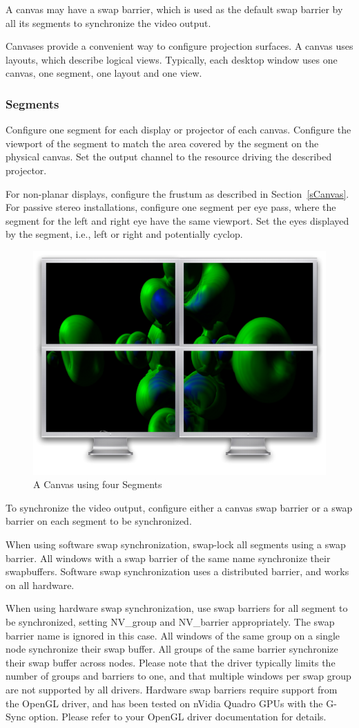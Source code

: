 \documentclass[10pt,a4]{scrartcl}
\newcommand{\sref}[1]{Section~\ref{#1}}
\begin{document}
A canvas may have a swap barrier, which is used as the default swap barrier by
all its segments to synchronize the video output.

Canvases provide a convenient way to configure projection surfaces. A canvas
uses layouts, which describe logical views. Typically, each desktop window uses
one canvas, one segment, one layout and one view.

\subsubsection{Segments}

Configure one \textsf{segment} for each display or projector of each
canvas. Configure the \textsf{viewport} of the segment to match the area
covered by the segment on the physical canvas. Set the output
\textsf{channel} to the resource driving the described projector.

For non-planar displays, configure the frustum as described in
\sref{sCanvas}. For passive stereo installations, configure one segment per eye
pass, where the segment for the left and right eye have the same viewport. Set
the eyes displayed by the segment, i.e., left or right and potentially cyclop.

\begin{figure}
  \includegraphics[width=.382\textwidth]{images/canvas.pdf}
  {\caption{\label{fCanvas}A Canvas using four Segments}}
\end{figure}
To synchronize the video output, configure either a canvas swap barrier or a
swap barrier on each segment to be synchronized.

When using software swap synchronization, swap-lock all segments using a swap
barrier. All windows with a swap barrier of the same name synchronize their
swapbuffers. Software swap synchronization uses a distributed barrier, and works
on all hardware.

When using hardware swap synchronization, use swap barriers for all segment to
be synchronized, setting \textsf{NV\_group} and \textsf{NV\_barrier}
appropriately. The swap barrier name is ignored in this case. All windows of the
same group on a single node synchronize their swap buffer. All groups of the
same barrier synchronize their swap buffer across nodes. Please note that the
driver typically limits the number of groups and barriers to one, and that
multiple windows per swap group are not supported by all drivers. Hardware swap
barriers require support from the OpenGL driver, and has been tested on nVidia
Quadro GPUs with the G-Sync option. Please refer to your OpenGL driver
documentation for details.
\end{document}
